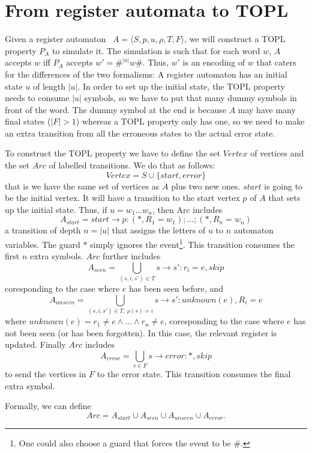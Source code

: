 \section{From register automata to TOPL}
Given a register automaton~\cite{dblp:journals/tcs/kaminskif94} $A=\langle S, p, u, \rho, T,
F\rangle$, we will construct a TOPL property $P_A$ to simulate it. The
simulation is such that for each word $w$, $A$ accepts $w$ iff $P_A$
accepts $w' = \#^{|u|}w\#$.  Thus, $w'$ is an encoding of $w$ that
caters for the differences of the two formalisms: A register automaton has an
initial state $u$ of length $|u|$. In order to set up the initial
state, the TOPL property needs to consume $|u|$ symbols, so we have to
put that many dummy symbols in front of the word. The dummy symbol at
the end is because $A$ may have many final states ($|F| > 1$) whereas a TOPL
property only has one, so we need to make an extra transition from all
the erroneous states to the actual error state.

\newcommand{\Vertex}{\mathit{Vertex}}
\newcommand{\Arc}{\mathit{Arc}}
To construct the TOPL property we have to define the set $\Vertex$
of vertices and the set $\Arc$ of labelled transitions. We do that as follows:
\[
\Vertex = S \cup \{start, error\}
\]
that is we have the same set of vertices as $A$ plus two new
ones. $start$ is going to be the initial vertex. It will have a
transition to the start vertex $p$ of $A$ that sets up the
initial state. Thus, if $u = w_1\ldots w_n$, then Arc includes
\[
A_{start} = start \to p: (*,R_1=w_1);\ldots;(*,R_n=w_n)
\]
a transition of depth $n = |u|$ that assigns the letters of $u$
to $n$ automaton variables. The guard $*$ simply ignores the
event\footnote{One could also choose a guard that forces the event
to be \#.}. This transition consumes the first $n$ extra
symbols. $\Arc$ further includes
\[
A_{seen} = \bigcup_{(s, i, s') \in T} s\to s': r_i=e, skip
\]
coresponding to the case where $e$ has been seen before, and
\[
A_{unseen} = \bigcup_{(s, i, s') \in T,\ \rho(s)=i} s\to s': unknown(e), R_i=e
\]
where $unknown(e) = r_1 \neq e \land \ldots \land r_n \neq e$,
coresponding to the case where $e$ has not been seen (or has been
forgotten). In this case, the relevant register is
updated. Finally $\Arc$ includes
\[
A_{error} = \bigcup_{s\in F} s\to error: *, skip
\]
to send the vertices in $F$ to the error state. This transition
consumes the final extra symbol.

Formally, we can define
\[
\Arc = A_{start} \cup A_{seen} \cup A_{unseen} \cup A_{error}.
\]
